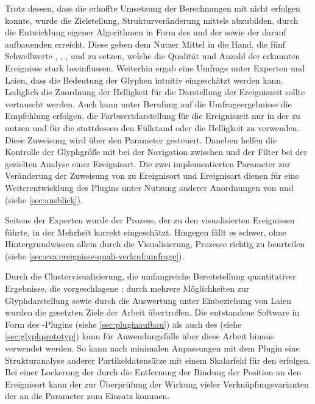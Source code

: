 Trotz dessen, dass die erhoffte Umsetzung der Berechnungen mit  nicht erfolgen konnte, wurde die Zielstellung, Strukturveränderung mittels  abzubilden, durch die Entwicklung eigener Algorithmen in Form des \CFD und der \SECC sowie der darauf aufbauenden  erreicht. Diese geben dem Nutzer Mittel in die Hand, die fünf Schwellwerte , , ,  und  zu setzen, welche die Qualität und Anzahl der erkannten Ereignisse stark beeinflussen. Weiterhin ergab eine Umfrage unter Experten und Laien, dass die Bedeutung der Glyphen intuitiv eingeschätzt werden kann. Lediglich die Zuordnung der Helligkeit für die Darstellung der Ereigniszeit sollte vertauscht werden. Auch kann unter Berufung auf die Umfrageergebnisse die Empfehlung erfolgen, die Farbwertdarstellung für die Ereigniszeit nur in der  zu nutzen und für die  stattdessen den Füllstand oder die Helligkeit zu verwenden. Diese Zuweisung wird über den Parameter  gesteuert. Daneben helfen die Kontrolle der Glyphgröße mit  bei der Navigation zwischen  und der Filter  bei der gezielten Analyse einer Ereignisart. Die zwei implementierten Parameter zur Veränderung der Zuweisung von  zu Ereignisort  und Ereignisart  dienen für eine Weiterentwicklung des Plugins unter Nutzung anderer Anordnungen von  und  (siehe \autoref{sec:ausblick}).

Seitens der Experten wurde der Prozess, der zu den visualisierten Ereignissen führte, in der Mehrheit korrekt eingeschätzt. Hingegen fällt es schwer, ohne Hintergrundwissen allein durch die Visualisierung, Prozesse richtig zu beurteilen (siehe \autoref{sec:eva:ereignisse-quali-verlauf:umfrage}).

Durch die Clustervisualisierung, die umfangreiche Bereitstellung quantitativer Ergebnisse, die vorgeschlagene ; durch mehrere Möglichkeiten zur Glyphdarstellung sowie durch die Auswertung unter Einbeziehung von Laien wurden die gesetzten Ziele der Arbeit übertroffen. Die entstandene Software in Form des -Plugins (siehe \autoref{sec:pluginaufbau}) als auch des  (siehe \autoref{sec:glyphprototyp}) kann für Anwendungsfälle über diese Arbeit hinaus verwendet werden. So kann nach minimalen Anpassungen mit dem Plugin eine Strukturanalyse anderer Partikeldatensätze mit einem Skalarfeld für den  erfolgen. Bei einer Lockerung der  durch die Entfernung der Bindung der Position an den Ereignisort kann der  zur Überprüfung der Wirkung vieler Verknüpfungsvarianten der  an die Parameter zum Einsatz kommen.

